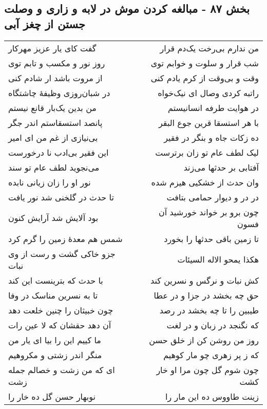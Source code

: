 \begin{center}
\section*{بخش ۸۷ - مبالغه کردن موش در لابه و زاری و وصلت جستن از چغز آبی}
\label{sec:sh087}
\begin{longtable}{l p{0.5cm} r}
گفت کای یار عزیز مهرکار
&&
من ندارم بی‌رخت یک‌دم قرار
\\
روز نور و مکسب و تابم توی
&&
شب قرار و سلوت و خوابم توی
\\
از مروت باشد ار شادم کنی
&&
وقت و بی‌وقت از کرم یادم کنی
\\
در شبان‌روزی وظیفهٔ چاشتگاه
&&
راتبه کردی وصال ای نیک‌خواه
\\
من بدین یک‌بار قانع نیستم
&&
در هوایت طرفه انسانیستم
\\
پانصد استسقاستم اندر جگر
&&
با هر استسقا قرین جوع البقر
\\
بی‌نیازی از غم من ای امیر
&&
ده زکات جاه و بنگر در فقیر
\\
این فقیر بی‌ادب نا درخورست
&&
لیک لطف عام تو زان برترست
\\
می‌نجوید لطف عام تو سند
&&
آفتابی بر حدثها می‌زند
\\
نور او را زان زیانی نابده
&&
وان حدث از خشکیی هیزم شده
\\
تا حدث در گلخنی شد نور یافت
&&
در در و دیوار حمامی بتافت
\\
بود آلایش شد آرایش کنون
&&
چون برو بر خواند خورشید آن فسون
\\
شمس هم معدهٔ زمین را گرم کرد
&&
تا زمین باقی حدثها را بخورد
\\
جزو خاکی گشت و رست از وی نبات
&&
هکذا یمحو الاله السیئات
\\
با حدث که بترینست این کند
&&
کش نبات و نرگس و نسرین کند
\\
تا به نسرین مناسک در وفا
&&
حق چه بخشد در جزا و در عطا
\\
چون خبیثان را چنین خلعت دهد
&&
طیبین را تا چه بخشد در رصد
\\
آن دهد حقشان که لا عین رات
&&
که نگنجد در زبان و در لغت
\\
ما کییم این را بیا ای یار من
&&
روز من روشن کن از خلق حسن
\\
منگر اندر زشتی و مکروهیم
&&
که ز پر زهری چو مار کوهیم
\\
ای که من زشت و خصالم جمله زشت
&&
چون شوم گل چون مرا او خار کشت
\\
نوبهار حسن گل ده خار را
&&
زینت طاووس ده این مار را
\\

\end{longtable}
\end{center}
